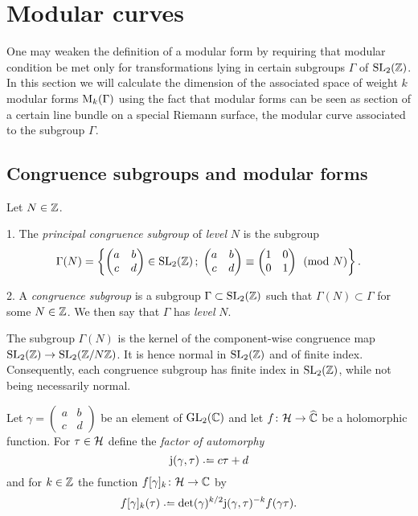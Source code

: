 \section{Modular curves}

\newcommand{\jrm}{\mathrm{j}}

One may weaken the definition of a modular form by requiring that modular condition be met only for transformations lying in certain subgroups $\Gamma$ of $\operatorname{SL}_2(\mathbb{Z})$. In this section we will calculate the dimension of the associated space of weight $k$ modular forms $\mathrm{M}_k(\Gamma)$ using the fact that modular forms can be seen as section of a certain line bundle on a special Riemann surface, the modular curve associated to the subgroup $\Gamma$.

\subsection{Congruence subgroups and modular forms}

\begin{defi}
 Let $N\in \mathbb{Z}$.
 
 1. The \emph{principal congruence subgroup} of \emph{level} $N$ is the subgroup
 \[\Gamma(N)=\left\{\begin{pmatrix} a & b \\ c & d \end{pmatrix}\in\operatorname{SL}_2(\mathbb{Z})\,;\; \begin{pmatrix}a & b \\ c & d\end{pmatrix} \equiv \begin{pmatrix}1 & 0 \\ 0 & 1\end{pmatrix} \pmod{N}\right\}.\]
 
 2. A \emph{congruence subgroup} is a subgroup $\Gamma\subset\operatorname{SL}_2(\mathbb{Z})$ such that $\Gamma(N)\subset\Gamma$ for some $N\in\mathbb{Z}$. We then say that $\Gamma$ has \emph{level} $N$. 
\end{defi}

\begin{rmk}
 The subgroup $\Gamma(N)$ is the kernel of the component-wise congruence map $\operatorname{SL}_2(\mathbb{Z})\to\operatorname{SL}_2(\mathbb{Z}/N\mathbb{Z})$. It is hence normal in $\operatorname{SL}_2(\mathbb{Z})$ and of finite index. Consequently, each congruence subgroup has finite index in $\operatorname{SL}_2(\mathbb{Z})$, while not being necessarily normal.
\end{rmk}

\begin{defi}
 Let $\gamma = \left(\begin{smallmatrix}a & b \\ c & d\end{smallmatrix}\right)$ be an element of $\operatorname{GL}_2(\mathbb{C})$ and let $f\colon\mathcal{H}\to\widehat{\mathbb{C}}$ be a holomorphic function. For $\tau\in\mathcal{H}$ define the \emph{factor of automorphy}
 \[\mathrm{j}(\gamma,\tau)\defeq c\tau+d\]
 and for $k\in \mathbb{Z}$ the function $f[\gamma]_k\colon\mathcal{H}\to\mathbb{C}$ by
 \[f[\gamma]_k(\tau) \defeq \det(\gamma)^{k/2}\jrm(\gamma,\tau)^{-k}f(\gamma\tau).\]
\end{defi}

